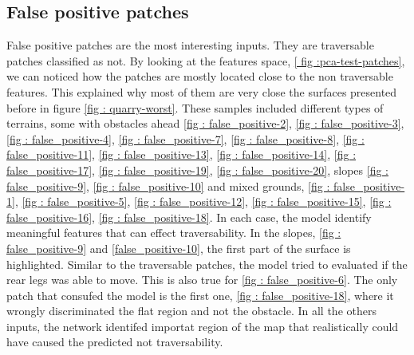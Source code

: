\subsection{False positive patches}
False positive patches are the most interesting inputs. They are traversable patches classified as not. By looking at the features space, \ref{ fig :pca-test-patches}, we can noticed how the patches are mostly located close to the non traversable features. This explained why most of them are very close the surfaces presented before in figure \ref{fig : quarry-worst}. These samples included different types of terrains, some with obstacles ahead \ref{fig : false_positive-2}, \ref{fig : false_positive-3}, \ref{fig : false_positive-4}, \ref{fig : false_positive-7}, \ref{fig : false_positive-8}, \ref{fig : false_positive-11}, \ref{fig : false_positive-13}, \ref{fig : false_positive-14}, \ref{fig : false_positive-17}, \ref{fig : false_positive-19}, \ref{fig : false_positive-20}, slopes \ref{fig : false_positive-9}, \ref{fig : false_positive-10} and mixed grounds, \ref{fig : false_positive-1}, \ref{fig : false_positive-5}, \ref{fig : false_positive-12}, \ref{fig : false_positive-15}, \ref{fig : false_positive-16}, \ref{fig : false_positive-18}. In each case, the model identify meaningful features that can effect traversability. In the slopes, \ref{fig : false_positive-9} and \ref{false_positive-10}, the first part of the surface is highlighted. Similar to the traversable patches, the model tried to evaluated if the rear legs was able to move. This is also true for   \ref{fig : false_positive-6}. The only patch that consufed the model is the first one, \ref{fig : false_positive-18}, where it wrongly discriminated the flat region and not the obstacle. In all the others inputs, the network identifed importat region of the map that realistically could have caused the predicted not traversability.

